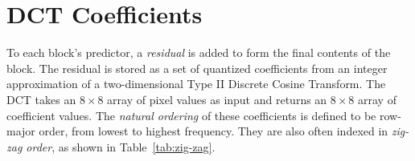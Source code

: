 \documentclass[11pt,letterpaper]{book}
\newcommand{\term}[1]{{\em #1}}
\numberwithin{equation}{chapter}
\numberwithin{figure}{chapter}
\numberwithin{table}{chapter}
\begin{document}
\section{DCT Coefficients}

To each block's predictor, a \term{residual} is added to form the final
 contents of the block.
The residual is stored as a set of quantized coefficients from an integer
 approximation of a two-dimensional Type II Discrete Cosine Transform.
The DCT takes an $8\times 8$ array of pixel values as input and returns an
 $8\times 8$ array of coefficient values.
The \term{natural ordering} of these coefficients is defined to be row-major
 order, from lowest to highest frequency.
They are also often indexed in \term{zig-zag order}, as shown in
 Table~\ref{tab:zig-zag}.
\end{document}
